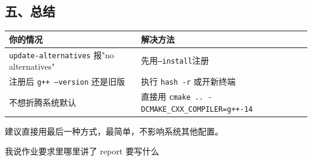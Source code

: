 \documentclass[11pt, a4paper]{article}
\begin{document}
\begin{aibox}
\subsection*{五、总结}

\vspace{0.5em}
\begin{tabularx}{\textwidth}{@{} l X @{}}
\toprule
你的情况 & 解决方法 \\
\midrule
\texttt{update-alternatives} 报"no alternatives" & 先用\texttt{--install}注册 \\
注册后 \texttt{g++ --version} 还是旧版 & 执行 \texttt{hash -r} 或开新终端 \\
不想折腾系统默认 & 直接用 \texttt{cmake .. -DCMAKE\_CXX\_COMPILER=g++-14} \\
\bottomrule
\end{tabularx}
\vspace{0.5em}

建议直接用最后一种方式，最简单，不影响系统其他配置。
\end{aibox}

\vspace{1.5em}

\begin{userbox}
我说作业要求里哪里讲了 report 要写什么
\end{userbox}
\end{document}

